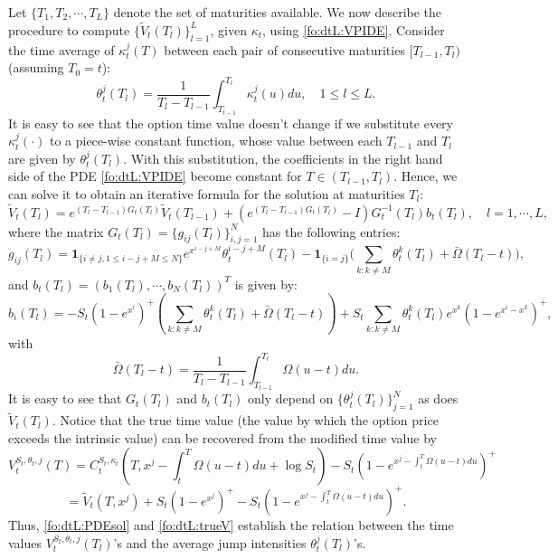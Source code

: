 \documentclass{article}
\numberwithin{equation}{section}
\def\bone{\mathbf{1}}
\def\tV{\tilde{V}}
\def\bOmega{\bar{\Omega}}
\begin{document}
Let $\{T_1, T_2,\cdots,T_L\}$ denote the set of maturities available. We now describe the procedure to compute $\{\tV_t(T_l)\}_{l=1}^L$, given $\kappa_t$, using \eqref{fo:dtL:VPIDE}. Consider the time average of $\kappa^j_t(T)$ between each pair of consecutive maturities $[T_{l-1}, T_l)$ (assuming $T_0 = t$):
\begin{equation}\label{fo:dtL:barkappa}
\theta^j_t(T_l) = \frac{1}{T_l - T_{l-1}} \int_{T_{l-1}}^{T_l} \kappa^j_t(u) du, \quad 1\le l\le L.
\end{equation}
It is easy to see that the option time value doesn't change if we substitute every $\kappa^j_t(\cdot)$ to a piece-wise constant function, whose value between each $T_{l-1}$ and $T_l$ are given by $\theta^j_t(T_l)$.
With this substitution, the coefficients in the right hand side of the PDE \eqref{fo:dtL:VPIDE} become constant for $T\in(T_{l-1},T_l)$. Hence, we can solve it to obtain an iterative formula for the solution at maturities $T_l$: \begin{equation}\label{fo:dtL:PDEsol}
\tV_t(T_l) = e^{(T_l-T_{l-1})G_t(T_l)}\tV_t(T_{l-1}) + (e^{(T_l-T_{l-1})G_t(T_l)} - I)G_t^{-1}(T_l) b_t(T_l), \quad l= 1,\cdots,L,
\end{equation}
where the matrix $G_t(T_l) = \{g_{ij}(T_l)\}_{i,j= 1}^N$ has the following entries:
\begin{equation*}
g_{ij}(T_l) = \bone_{\{i \neq j, 1 \leq i-j+M \leq N\}} e^{x^{i-j+M}} \theta_t^{i-j+M}(T_l) - \bone_{\{i=j\}} \bigg(\underset{k:k\neq M}\sum \theta^k_t(T_l) + \bOmega(T_l-t) \bigg),
\end{equation*}
and $b_t(T_l) = (b_1(T_l),\cdots,b_N(T_l))^T$ is given by:
\begin{equation*}
b_i(T_l) = -S_t(1-e^{x^i})^+ \left(\underset{k:k\neq M}\sum \theta_t^k(T_l)+\bOmega(T_l-t)\right) + S_t \underset{k:k\neq M}\sum \theta_t^k(T_l) e^{x^k} (1-e^{x^i-x^k})^+,
\end{equation*}
with 
\begin{equation}\label{fo:dtL:avgsym}
\bOmega(T_l-t) = \frac{1}{T_l - T_{l-1}} \int_{T_{l-1}}^{T_l} \Omega(u-t) du. 
\end{equation}
It is easy to see that $G_t(T_l)$ and $b_t(T_l)$ only depend on $\{\theta_t^j(T_l)\}_{j=1}^N$ as does $\tV_t(T_l)$. Notice that the true time value (the value by which the option price exceeds the intrinsic value) can be recovered from the modified time value by
\begin{equation}\label{fo:dtL:trueV}
V^{S_t,\theta_t,j}_t(T) = C^{S_t,\kappa_t}_t\left(T,x^j - \int_t^T \Omega(u-t) du + \log S_t\right) - S_t\left(1-e^{x^j - \int_t^T \Omega(u-t) du}\right)^+ 
\end{equation}
\begin{equation*}
= \tV_t\left(T,x^j \right) + S_t\left(1-e^{x^j}\right)^+ - S_t\left(1-e^{x^j - \int_t^T \Omega(u-t) du}\right)^+.
\end{equation*}
Thus, \eqref{fo:dtL:PDEsol} and \eqref{fo:dtL:trueV} establish the relation between the time values $V^{S_t,\theta_t,j}_t(T_l)$'s and the average jump intensities $\theta^j_t(T_l)$'s.
\end{document}
